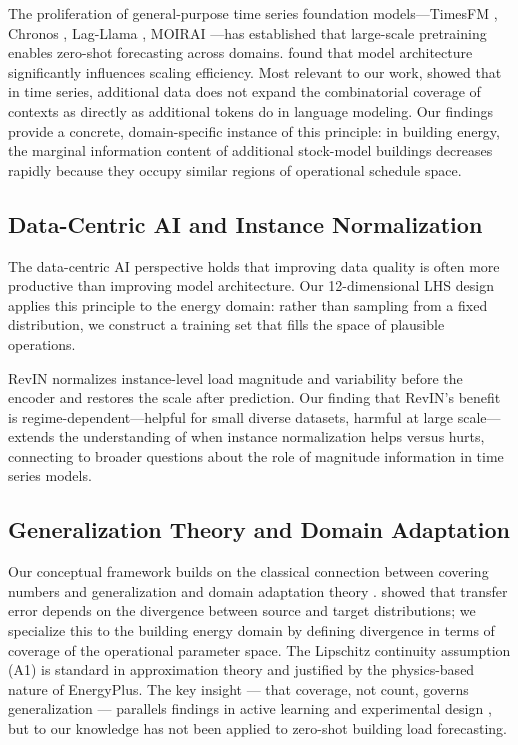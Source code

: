 \documentclass[preprint,12pt,authoryear]{elsarticle}
\begin{document}
The proliferation of general-purpose time series foundation models---TimesFM \citep{Das2024}, Chronos \citep{Ansari2024}, Lag-Llama \citep{Rasul2023}, MOIRAI \citep{Woo2024}---has established that large-scale pretraining enables zero-shot forecasting across domains. \citet{Yao2025} found that model architecture significantly influences scaling efficiency. Most relevant to our work, \citet{Shi2024} showed that in time series, additional data does not expand the combinatorial coverage of contexts as directly as additional tokens do in language modeling. Our findings provide a concrete, domain-specific instance of this principle: in building energy, the marginal information content of additional stock-model buildings decreases rapidly because they occupy similar regions of operational schedule space.

\subsection{Data-Centric AI and Instance Normalization}

The data-centric AI perspective \citep{Zha2023} holds that improving data quality is often more productive than improving model architecture. Our 12-dimensional LHS design applies this principle to the energy domain: rather than sampling from a fixed distribution, we construct a training set that fills the space of plausible operations.

RevIN \citep{Kim2022} normalizes instance-level load magnitude and variability before the encoder and restores the scale after prediction. Our finding that RevIN's benefit is regime-dependent---helpful for small diverse datasets, harmful at large scale---extends the understanding of when instance normalization helps versus hurts, connecting to broader questions about the role of magnitude information in time series models.

\subsection{Generalization Theory and Domain Adaptation}

Our conceptual framework builds on the classical connection between covering numbers and generalization \citep{Anthony1999} and domain adaptation theory \citep{BenDavid2010}. \citet{BenDavid2010} showed that transfer error depends on the divergence between source and target distributions; we specialize this to the building energy domain by defining divergence in terms of coverage of the operational parameter space. The Lipschitz continuity assumption (A1) is standard in approximation theory and justified by the physics-based nature of EnergyPlus. The key insight --- that coverage, not count, governs generalization --- parallels findings in active learning \citep{Settles2009} and experimental design \citep{Sacks1989}, but to our knowledge has not been applied to zero-shot building load forecasting.
\end{document}

